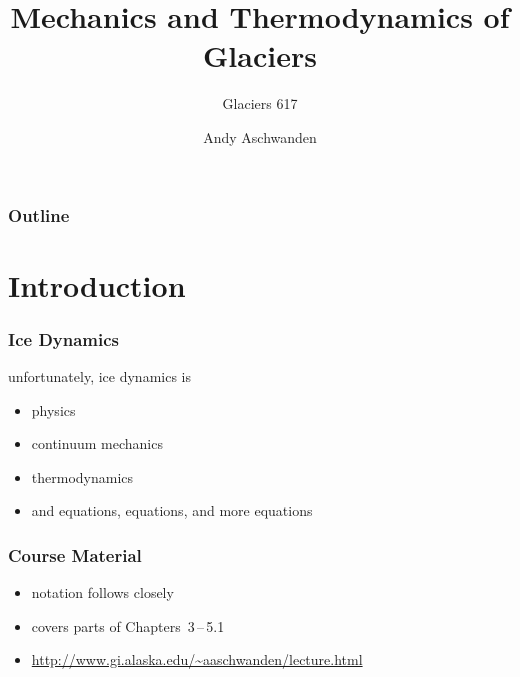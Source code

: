 \documentclass[hide notes,intlimits]{beamer}
\title[Glacier Dynamics] %
{Mechanics and Thermodynamics of Glaciers}
\subtitle{Glaciers 617}
\author[Aschwanden] %
{Andy Aschwanden}
\institute[ARSC] %
{
  Arctic Region Supercomputing Center\\
  University of Alaska Fairbanks, USA
}
\begin{document}
\begin{frame}
  \titlepage
\end{frame}

\begin{frame}
 \frametitle{Outline}
 \tableofcontents[subsectionstyle=hide]
\end{frame}

\section{Introduction}



\begin{frame}[plain] %
  \begin{figure}
  \end{figure}
\end{frame}

\begin{frame}
  \frametitle{Ice Dynamics}
  unfortunately, \alert{ice dynamics} is
  \begin{itemize}
    \item physics
    \item continuum mechanics
    \item thermodynamics
    \item and equations, equations, and more equations
  \end{itemize}
\end{frame}

\begin{frame}
  \frametitle{Course Material}
  \begin{itemize}
    \item notation follows closely \cite{GreveBlatter_disg}
    \item covers parts of Chapters~3\,--\,5.1
    \item \url{http://www.gi.alaska.edu/~aaschwanden/lecture.html}
  \end{itemize}
  \def\newblock{}
  
\end{frame}
\end{document}
